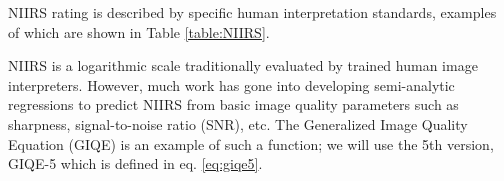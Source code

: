 \documentclass[10pt,journal]{IEEEtran}  %
\begin{document}
NIIRS rating is described by specific human interpretation standards, examples of which are shown in Table \ref{table:NIIRS}\cite{niirs}.

\begin{table}[h!t]
\centering
\caption{NIIRS definitions}
\label{table:NIIRS}
\end{table}

NIIRS is a logarithmic scale traditionally evaluated by trained human image interpreters.  However, much work has gone into developing semi-analytic regressions to predict NIIRS from basic image quality parameters such as sharpness, signal-to-noise ratio (SNR), etc. The Generalized Image Quality Equation (GIQE) is an example of such a function; we will use the 5th version, GIQE-5 which is defined in eq. \ref{eq:giqe5}.
\end{document}
